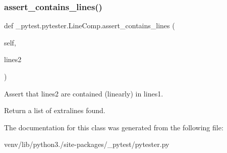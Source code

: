 \subsubsection{\texorpdfstring{assert\+\_\+contains\+\_\+lines()}{assert\_contains\_lines()}}
{\footnotesize\ttfamily def \+\_\+pytest.\+pytester.\+Line\+Comp.\+assert\+\_\+contains\+\_\+lines (\begin{DoxyParamCaption}\item[{}]{self,  }\item[{}]{lines2 }\end{DoxyParamCaption})}

\begin{DoxyVerb}Assert that lines2 are contained (linearly) in lines1.

Return a list of extralines found.\end{DoxyVerb}
 

The documentation for this class was generated from the following file\+:\begin{DoxyCompactItemize}
\item 
venv/lib/python3./site-\/packages/\+\_\+pytest/pytester.\+py\end{DoxyCompactItemize}

